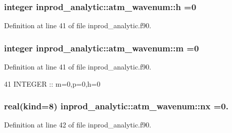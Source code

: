 \subsubsection[{\texorpdfstring{h}{h}}]{\setlength{\rightskip}{0pt plus 5cm}integer inprod\+\_\+analytic\+::atm\+\_\+wavenum\+::h =0\hspace{0.3cm}{\ttfamily [private]}}\hypertarget{structinprod__analytic_1_1atm__wavenum_aa7df1690e97e43365ca0c2b1222924b5}{}\label{structinprod__analytic_1_1atm__wavenum_aa7df1690e97e43365ca0c2b1222924b5}


Definition at line 41 of file inprod\+\_\+analytic.\+f90.

\subsubsection[{\texorpdfstring{m}{m}}]{\setlength{\rightskip}{0pt plus 5cm}integer inprod\+\_\+analytic\+::atm\+\_\+wavenum\+::m =0\hspace{0.3cm}{\ttfamily [private]}}\hypertarget{structinprod__analytic_1_1atm__wavenum_a72be0a86c5f5801b88ebf78506523bd2}{}\label{structinprod__analytic_1_1atm__wavenum_a72be0a86c5f5801b88ebf78506523bd2}


Definition at line 41 of file inprod\+\_\+analytic.\+f90.


\begin{DoxyCode}
41      \textcolor{keywordtype}{INTEGER} :: m=0,p=0,h=0
\end{DoxyCode}
\subsubsection[{\texorpdfstring{nx}{nx}}]{\setlength{\rightskip}{0pt plus 5cm}real(kind=8) inprod\+\_\+analytic\+::atm\+\_\+wavenum\+::nx =0.\hspace{0.3cm}{\ttfamily [private]}}\hypertarget{structinprod__analytic_1_1atm__wavenum_ad67bf9989f5524b1f97dc7211ef78db2}{}\label{structinprod__analytic_1_1atm__wavenum_ad67bf9989f5524b1f97dc7211ef78db2}


Definition at line 42 of file inprod\+\_\+analytic.\+f90.


